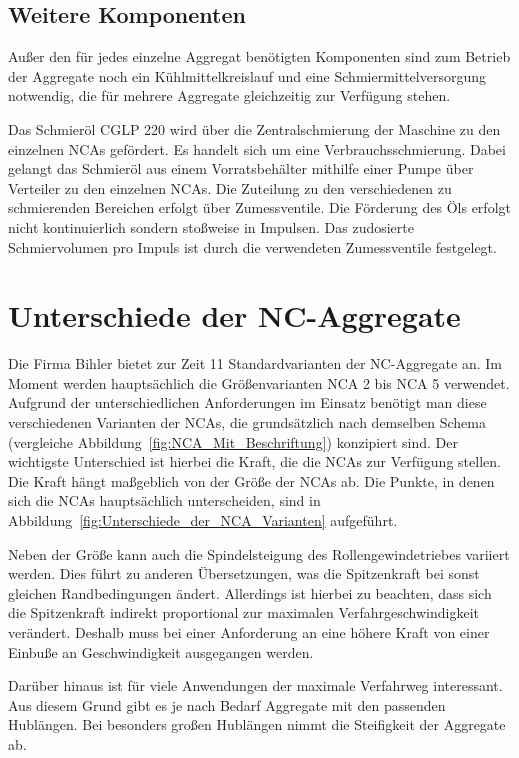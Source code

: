 \subsection{Weitere Komponenten}\label{cha:Kuelkreislauf_Schmierkreislauf}

Außer den für jedes einzelne Aggregat benötigten Komponenten sind zum Betrieb der Aggregate noch ein Kühlmittelkreislauf und eine Schmiermittelversorgung notwendig, die für mehrere Aggregate gleichzeitig zur Verfügung stehen.

Das Schmieröl CGLP 220 wird über die Zentralschmierung der Maschine zu den einzelnen NCAs gefördert. Es handelt sich um eine Verbrauchsschmierung. Dabei gelangt das Schmieröl aus einem Vorratsbehälter mithilfe einer Pumpe über Verteiler zu den einzelnen NCAs. Die Zuteilung zu den verschiedenen zu schmierenden Bereichen erfolgt über Zumessventile. Die Förderung des Öls erfolgt nicht kontinuierlich sondern stoßweise in Impulsen. Das zudosierte Schmiervolumen pro Impuls ist durch die verwendeten Zumessventile festgelegt. 

\section{Unterschiede der NC-Aggregate}\label{cha:Unterschiede der NC-Aggregate}

Die Firma Bihler bietet zur Zeit 11 Standardvarianten der NC-Aggregate an. Im Moment werden hauptsächlich die Größenvarianten NCA 2 bis NCA 5 verwendet. Aufgrund der unterschiedlichen Anforderungen im Einsatz benötigt man diese verschiedenen Varianten der NCAs, die grundsätzlich nach demselben Schema (vergleiche Abbildung~\ref{fig:NCA_Mit_Beschriftung}) konzipiert sind. Der wichtigste Unterschied ist hierbei die Kraft, die die NCAs zur Verfügung stellen. Die Kraft hängt maßgeblich von der Größe der NCAs ab. Die Punkte, in denen sich die NCAs hauptsächlich unterscheiden, sind in Abbildung~\ref{fig:Unterschiede_der_NCA_Varianten} aufgeführt.



Neben der Größe kann auch die Spindelsteigung des Rollengewindetriebes variiert werden. Dies führt zu anderen Übersetzungen, was die Spitzenkraft bei sonst gleichen Randbedingungen ändert. Allerdings ist hierbei zu beachten, dass sich die Spitzenkraft indirekt proportional zur maximalen Verfahrgeschwindigkeit verändert.  Deshalb muss bei einer Anforderung an eine höhere Kraft von einer Einbuße an Geschwindigkeit ausgegangen werden.

Darüber hinaus ist für viele Anwendungen der maximale Verfahrweg interessant. Aus diesem Grund gibt es je nach Bedarf Aggregate mit den passenden Hublängen. Bei besonders großen Hublängen nimmt die Steifigkeit der Aggregate ab.


